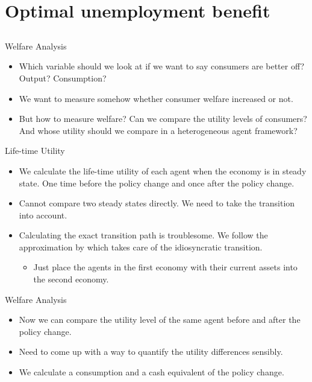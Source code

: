 \documentclass{beamer}
\begin{document}
\section{Optimal unemployment benefit}
\subsection{}
\begin{frame}{Welfare Analysis}
  \begin{itemize}
  \item {
  Which variable should we look at if we want to say consumers are better off? Output? Consumption?
  }
  \item {
  We want to measure somehow whether consumer welfare increased or not.
  }
  \item {
  But how to measure welfare? Can we compare the utility levels of consumers? And whose utility should we compare in a heterogeneous agent framework?
  }
  \end{itemize}
\end{frame}

\begin{frame}{Life-time Utility}
  \begin{itemize}
  \item {
  We calculate the life-time utility of each agent when the economy is in steady state. One time before the policy change and once after the policy change.
  }
  \item {
  Cannot compare two steady states directly. We need to take the transition into account.
  }
  \item {
  Calculating the exact transition path is troublesome. We follow the approximation by \citeauthor{sahin} \cite{sahin} which takes care of the idiosyncratic transition.
  }
    \begin{itemize}
    \item {
    Just place the agents in the first economy with their current assets into the second economy.
    }
    \end{itemize}
  \end{itemize}
\end{frame}

\begin{frame}{Welfare Analysis}
  \begin{itemize}
  \item {
  Now we can compare the utility level of the same agent before and after the policy change.
  }
  \item {
  Need to come up with a way to quantify the utility differences sensibly.
  }
  \item {
  We calculate a consumption and a cash equivalent of the policy change.
  }
  \end{itemize}
\end{frame}
\end{document}
